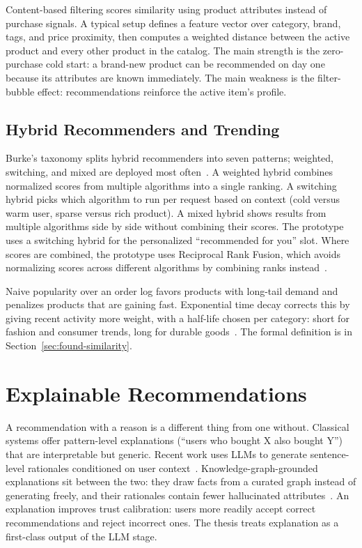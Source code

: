 Content-based filtering scores similarity using product
attributes instead of purchase signals. A typical setup defines a
feature vector over category, brand, tags, and price proximity,
then computes a weighted distance between the active product and
every other product in the catalog. The main strength is the
zero-purchase cold start: a brand-new product can be recommended
on day one because its attributes are known immediately. The main
weakness is the filter-bubble effect: recommendations reinforce
the active item's profile.

\subsection{Hybrid Recommenders and Trending}
\label{subsec:bg-hybrid}

Burke's taxonomy splits hybrid recommenders into seven patterns;
weighted, switching, and mixed are deployed most
often~\cite{Burke2002Hybrid}. A weighted hybrid combines
normalized scores from multiple algorithms into a single ranking.
A switching hybrid picks which algorithm to run per request based
on context (cold versus warm user, sparse versus rich product). A
mixed hybrid shows results from multiple algorithms side by side
without combining their scores. The prototype uses a switching
hybrid for the personalized ``recommended for you'' slot. Where
scores are combined, the prototype uses Reciprocal Rank Fusion,
which avoids normalizing scores across different algorithms by
combining ranks instead~\cite{LLM4Rec2025}.

Naive popularity over an order log favors products with long-tail
demand and penalizes products that are gaining fast. Exponential
time decay corrects this by giving recent activity more weight,
with a half-life chosen per category: short for fashion and
consumer trends, long for durable
goods~\cite{SessionRecSys2021}. The formal definition is in
Section~\ref{sec:found-similarity}.

\section{Explainable Recommendations}
\label{sec:bg-explainable}

A recommendation with a reason is a different thing from one
without. Classical systems offer pattern-level explanations
(``users who bought X also bought Y'') that are interpretable but
generic. Recent work uses LLMs to generate sentence-level
rationales conditioned on user
context~\cite{LLMEnhancedRecSys2024}. Knowledge-graph-grounded
explanations sit between the two: they draw facts from a curated
graph instead of generating freely, and their rationales contain
fewer hallucinated attributes~\cite{ExplainableRecKG2024}. An
explanation improves trust calibration: users more readily accept
correct recommendations and reject incorrect ones. The thesis
treats explanation as a first-class output of the LLM stage.

